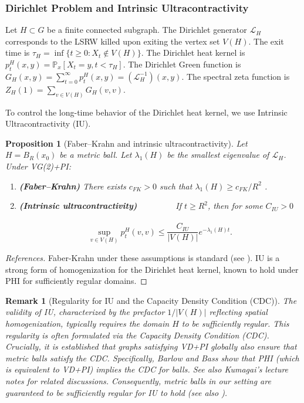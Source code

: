 \documentclass[11pt]{article}
\numberwithin{equation}{section}
\newtheorem{proposition}[theorem]{Proposition}
\newtheorem{remark}[theorem]{Remark}
\newcommand{\LL}{\mathcal{L}}
\newcommand{\Prob}{\mathbb{P}}
\begin{document}
\subsubsection{Dirichlet Problem and Intrinsic Ultracontractivity}
Let $H \subset G$ be a finite connected subgraph.
The Dirichlet generator $\LL_H$ corresponds to the LSRW killed upon exiting the vertex set $V(H)$. The exit time is $\tau_H = \inf\{t \geq 0 : X_t \notin V(H)\}$.
The Dirichlet heat kernel is $p_t^H(x,y) = \Prob_x[X_t = y, t < \tau_H]$. The Dirichlet Green function is $G_H(x,y) = \sum_{t=0}^{\infty} p_t^H(x,y) = (\LL_H^{-1})(x,y)$. The spectral zeta function is $Z_H(1) = \sum_{v \in V(H)} G_H(v,v)$.

To control the long-time behavior of the Dirichlet heat kernel, we use Intrinsic Ultracontractivity (IU).

\begin{proposition}[Faber--Krahn and intrinsic ultracontractivity]\label{prop:IU}
Let $H=B_R(x_0)$ be a metric ball. Let $\lambda_1(H)$ be the smallest eigenvalue of $\LL_H$. Under VG(2)+PI:
\begin{enumerate}
    \item \textbf{(Faber--Krahn)} There exists $c_{FK}>0$ such that $\lambda_1(H)\ge c_{FK}/R^{2}$ \cite[Prop.\,5.1]{BarlowBass04}.
    \item \textbf{(Intrinsic ultracontractivity)}
          If $t\ge R^{2}$, then for some $C_{IU}>0$
    \begin{equation}\label{eq:IU}
        \sup_{v \in V(H)} p_t^H(v,v) \leq \frac{C_{IU}}{|V(H)|} e^{-\lambda_1(H) t}.
    \end{equation}
\end{enumerate}
\end{proposition}
\begin{proof}[References]
Faber-Krahn under these assumptions is standard (see \cite{Grigoryan09}). IU is a strong form of homogenization for the Dirichlet heat kernel, known to hold under PHI for sufficiently regular domains.
\end{proof}

\begin{remark}[Regularity for IU and the Capacity Density Condition (CDC)]\label{rem:IU_regularity}
The validity of IU, characterized by the prefactor $1/|V(H)|$ reflecting spatial homogenization, typically requires the domain $H$ to be sufficiently regular. This regularity is often formulated via the Capacity Density Condition (CDC). Crucially, it is established that graphs satisfying VD+PI globally also ensure that metric balls satisfy the CDC.
Specifically, Barlow and Bass \cite[Proposition 3.5]{BarlowBass04} show that PHI (which is equivalent to VD+PI) implies the CDC for balls. See also Kumagai's lecture notes \cite{KumagaiNotes} for related discussions. Consequently, metric balls in our setting are guaranteed to be sufficiently regular for IU to hold (see also \cite{BassKumagai08}).
\end{remark}
\end{document}
